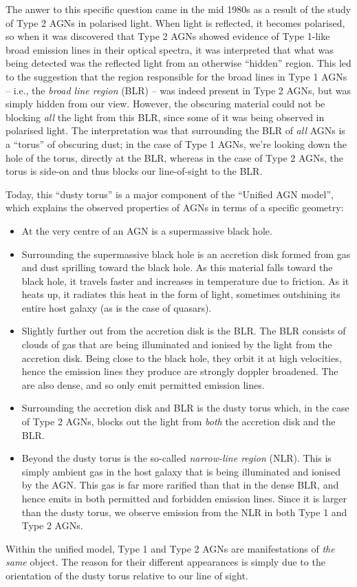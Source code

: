 \documentclass[11pt]{article}
\begin{document}
The anwer to this specific question came in the mid 1980s as a result
of the study of Type 2 AGNs in polarised light. When light is
reflected, it becomes polarised, so when it was discovered that Type 2
AGNs showed evidence of Type 1-like broad emission lines in their
optical spectra, it was interpreted that what was being detected was
the reflected light from an otherwise ``hidden'' region. This led to
the suggestion that the region responsible for the broad lines in Type
1 AGNs -- i.e., the {\it broad line region} (BLR) -- was indeed
present in Type 2 AGNs, but was simply hidden from our view. However,
the obscuring material could not be blocking {\it all} the light from
this BLR, since some of it was being observed in polarised light. The
interpretation was that surrounding the BLR of {\it all} AGNs is a
``torus'' of obscuring dust; in the case of Type 1 AGNs, we're looking
down the hole of the torus, directly at the BLR, whereas in the case
of Type 2 AGNs, the torus is side-on and thus blocks our line-of-sight
to the BLR.

Today, this ``dusty torus'' is a major component of the ``Unified AGN
model'', which explains the observed properties of AGNs in terms of a
specific geometry:
\begin{itemize}
\item At the very centre of an AGN is a supermassive black hole.
\item Surrounding the supermassive black hole is an accretion disk
  formed from gas and dust sprilling toward the black hole. As this
  material falls toward the black hole, it travels faster and
  increases in temperature due to friction. As it heats up, it
  radiates this heat in the form of light, sometimes outshining its
  entire host galaxy (as is the case of quasars).
\item Slightly further out from the accretion disk is the BLR. The BLR
  consists of clouds of gas that are being illuminated and ionised by
  the light from the accretion disk. Being close to the black hole,
  they orbit it at high velocities, hence the emission lines they
  produce are strongly doppler broadened. The are also dense, and
  so only emit permitted emission lines.
\item Surrounding the accretion disk and BLR is the dusty torus which,
  in the case of Type 2 AGNs, blocks out the light from {\it both} the
  accretion disk and the BLR.
\item Beyond the dusty torus is the so-called {\it narrow-line region}
  (NLR). This is simply ambient gas in the host galaxy that is being
  illuminated and ionised by the AGN. This gas is far more rarified
  than that in the dense BLR, and hence emits in both permitted and
  forbidden emission lines. Since it is larger than the dusty torus,
  we observe emission from the NLR in both Type 1 and Type 2 AGNs.
\end{itemize}
Within the unified model, Type 1 and Type 2 AGNs are manifestations of
{\it the same} object. The reason for their different appearances is
simply due to the orientation of the dusty torus relative to our line
of sight.
\end{document}
